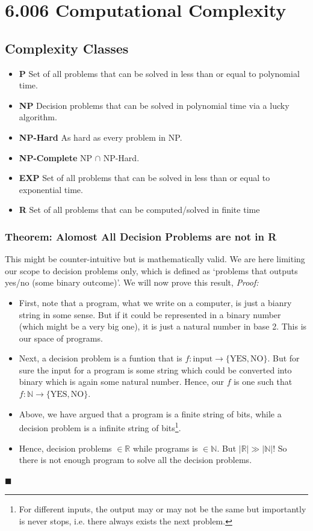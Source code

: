\documentclass[10pt]{article}
\newcommand{\real}{\mathbb{R}}
\begin{document}
\section{6.006 Computational Complexity}
\subsection{Complexity Classes}
\begin{itemize}
    \item \textbf{P} Set of all problems that can be solved in less than or equal to polynomial time.
    \item \textbf{NP} Decision problems that can be solved in polynomial time via a lucky algorithm.
    \item \textbf{NP-Hard} As hard as every problem in NP.
    \item \textbf{NP-Complete} NP $\cap$ NP-Hard.
    \item \textbf{EXP} Set of all problems that can be solved in less than or equal to exponential time.
    \item \textbf{R} Set of all problems that can be computed/solved in finite time
\end{itemize}

\subsubsection{Theorem: Alomost All Decision Problems are not in R}
This might be counter-intuitive but is mathematically valid. We are here limiting our scope to decision problems only, which is defined as `problems that outputs yes/no (some binary outcome)'. We will now prove this result, \textit{Proof:}
\begin{itemize}
    \item First, note that a program, what we write on a computer, is just a bianry string in some sense. But if it could be represented in a binary number (which might be a very big one), it is just a natural number in base 2. This is our space of programs.
    \item Next, a decision problem is a funtion that is $f: \text{input} \rightarrow \{\text{YES}, \text{NO}\}$. But for sure the input for a program is some string which could be converted into binary which is again some natural number. Hence, our $f$ is one such that $f:\mathbb{N} \rightarrow \{\text{YES}, \text{NO}\}$. 
    \item Above, we have argued that a program is a finite string of bits, while a decision problem is a infinite string of bits\footnote{For different inputs, the output may or may not be the same but importantly is never stops, i.e. there always exists the next problem.}.
    \item Hence, decision problems $\in \real$ while programs is $\in \mathbb{N}$. But $|\mathbb{R}| \gg |\mathbb{N}|$! So there is not enough program to solve all the decision problems. 
\end{itemize}
\hfill $\blacksquare$
\end{document}
